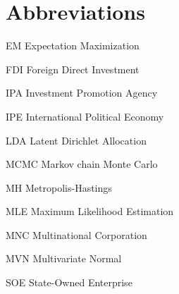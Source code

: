 \abbreviations





\section*{Abbreviations}

\begin{symbollist}
  \item[EM] Expectation Maximization
	\item[FDI] Foreign Direct Investment
  \item[IPA] Investment Promotion Agency
  \item[IPE] International Political Economy
    \item[LDA] Latent Dirichlet Allocation
	\item[MCMC] Markov chain Monte Carlo
  \item[MH] Metropolis-Hastings
	\item[MLE] Maximum Likelihood Estimation
  \item[MNC] Multinational Corporation
  \item[MVN] Multivariate Normal
  \item[SOE] State-Owned Enterprise
\end{symbollist}
